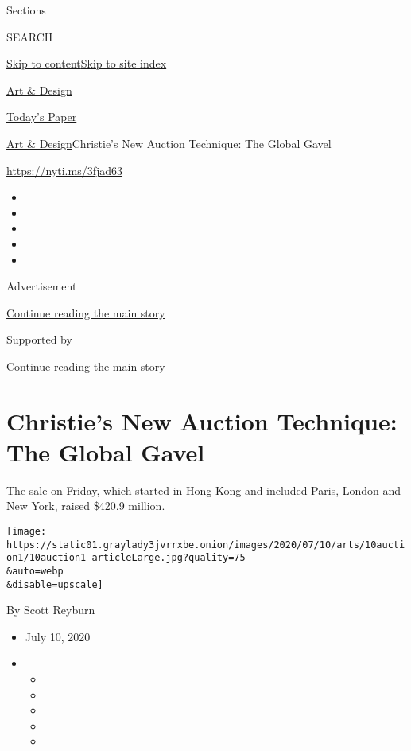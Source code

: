 Sections

SEARCH

\protect\hyperlink{site-content}{Skip to
content}\protect\hyperlink{site-index}{Skip to site index}

\href{https://www.nytimes3xbfgragh.onion/section/arts/design}{Art \&
Design}

\href{https://myaccount.nytimes3xbfgragh.onion/auth/login?response_type=cookie\&client_id=vi}{}

\href{https://www.nytimes3xbfgragh.onion/section/todayspaper}{Today's
Paper}

\href{/section/arts/design}{Art \& Design}\textbar{}Christie's New
Auction Technique: The Global Gavel

\url{https://nyti.ms/3fjad63}

\begin{itemize}
\item
\item
\item
\item
\item
\end{itemize}

Advertisement

\protect\hyperlink{after-top}{Continue reading the main story}

Supported by

\protect\hyperlink{after-sponsor}{Continue reading the main story}

\hypertarget{christies-new-auction-technique-the-global-gavel}{%
\section{Christie's New Auction Technique: The Global
Gavel}\label{christies-new-auction-technique-the-global-gavel}}

The sale on Friday, which started in Hong Kong and included Paris,
London and New York, raised \$420.9 million.

\texttt{[image: https://static01.graylady3jvrrxbe.onion/images/2020/07/10/arts/10auction1/10auction1-articleLarge.jpg?quality=75\\\&auto=webp\\\&disable=upscale]}

By Scott Reyburn

\begin{itemize}
\item
  July 10, 2020
\item
  \begin{itemize}
  \item
  \item
  \item
  \item
  \item
  \end{itemize}
\end{itemize}

